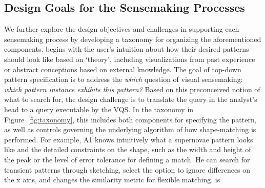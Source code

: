 \subsection{Design Goals for the Sensemaking Processes}
We further explore the design objectives 
and challenges in supporting each sensemaking 
process by developing a taxonomy 
for organizing the aforementioned components.%
begins with the user's intuition 
about how their desired patterns 
should look like based on `theory', 
including visualizations from 
past experience or abstract conceptions 
based on external knowledge. 
The goal of top-down pattern 
specification is to address the \textit{which} question 
of visual sensemaking: \textit{which pattern instance exhibits this pattern?}%
Based on this preconceived notion of what to search for, 
the design challenge is to translate the query in the 
analyst's head to a query executable by the VQS. 
In the  taxonomy in Figure~\ref{fig:taxonomy}, 
this includes both components for specifying the pattern, 
as well as controls governing the underlying 
algorithm of how shape-matching is performed. 
For example, A1 knows intuitively 
what a supernovae pattern looks like 
and the detailed constraints on the shape, 
such as the width and height of the peak 
or the level of error tolerance for defining a match. 
He can search for transient patterns through sketching, 
select the option to ignore differences 
on the x axis, and changes the similarity metric for flexible matching.  %
 is 
